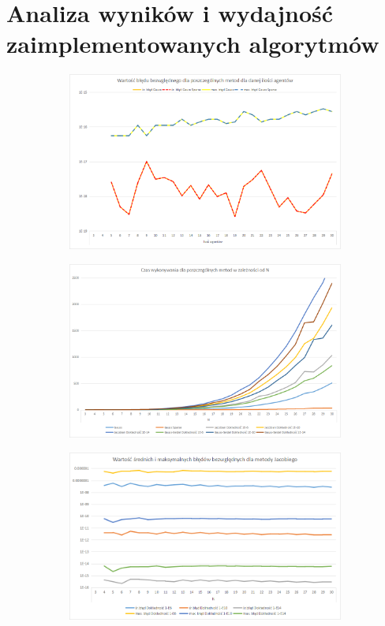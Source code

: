 \documentclass[10pt]{article}
\begin{document}
\section{Analiza wyników i wydajność zaimplementowanych algorytmów}
\begin{figure}[h]
	\caption{Wykresy reprezentujące czas wykonania i błędy bezwzględne zaimplementowanych algorytmów \label{rys}}
	\begin{subfigure}{0.5\textwidth}
		\includegraphics[width=\textwidth]{2.png}
		\caption{ \label{Rys2a}}
	\end{subfigure}
	\begin{subfigure}{0.5\textwidth}
	\includegraphics[width=\textwidth]{3.png}
	\caption{ \label{Rys2b}}
	\end{subfigure}
	\begin{subfigure}{0.5\textwidth}
	\includegraphics[width=\textwidth]{4.png}

\end{subfigure}
\end{figure}
\end{document}
